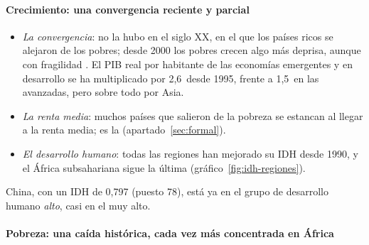 \documentclass[11pt]{article}
\begin{document}
\paragraph{Crecimiento: una convergencia reciente y parcial}

\begin{itemize}
\item \emph{La convergencia}: no la hubo en el siglo XX, en el que los países ricos se alejaron de los pobres; desde 2000 los pobres crecen algo más deprisa, aunque con fragilidad\nocite{KremerWillisYou2022} . El PIB real por habitante de las economías emergentes y en desarrollo se ha multiplicado por 2,6~desde 1995, frente a 1,5~en las avanzadas, pero sobre todo por Asia\nocite{FMI2026WEOdatos}.
\item \emph{La renta media}: muchos países que salieron de la pobreza se estancan al llegar a la renta media; es la \nocite{GillKharas2007East} (apartado~\ref{sec:formal}).
\item \emph{El desarrollo humano}: todas las regiones han mejorado su IDH desde 1990, y el África subsahariana sigue la última (gráfico~\ref{fig:idh-regiones}).
\end{itemize}

\begin{anotaciones}
\begin{figuracaja}
\caption{Índice de desarrollo humano por grupos de desarrollo humano y por regiones, 1990 y 2023}\label{fig:idh-regiones}
\end{figuracaja}
China, con un IDH de 0,797 (puesto 78), está ya en el grupo de desarrollo humano \emph{alto}, casi en el muy alto\nocite{PNUD2025IDH}.
\end{anotaciones}

\paragraph{Pobreza: una caída histórica, cada vez más concentrada en África}
\end{document}
